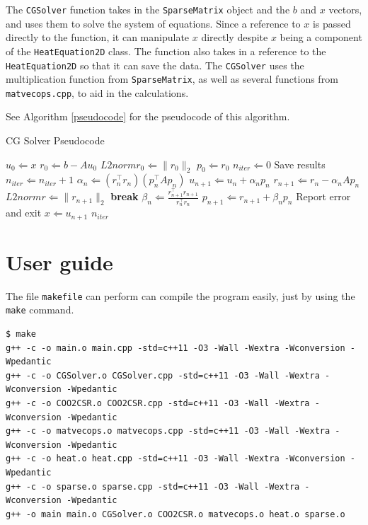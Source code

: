 \documentclass{article}
\begin{document}
The \texttt{CGSolver} function takes in the \texttt{SparseMatrix} object and the $b$ and $x$ vectors, and uses them to solve the system of equations.  Since a reference to $x$ is passed directly to the function, it can manipulate $x$ directly despite $x$ being a component of the \texttt{HeatEquation2D} class.  The function also takes in a reference to the \texttt{HeatEquation2D} so that it can save the data.  The \texttt{CGSolver} uses the multiplication function from \texttt{SparseMatrix}, as well as several functions from \texttt{matvecops.cpp}, to aid in the calculations.

See Algorithm \ref{pseudocode} for the pseudocode of this algorithm.

\begin{algorithm}
  \caption{CG Solver Pseudocode}
  \label{pseudocode}
  \begin{algorithmic}
    \STATE $u_0 \Leftarrow x$
    \STATE $r_0 \Leftarrow b - A u_0$
    \STATE $L2normr_0 \Leftarrow \|r_0\|_2$
    \STATE $p_0 \Leftarrow r_0$
    \STATE $n_{iter} \Leftarrow 0$
        \STATE Save results
      \ENDIF
      \STATE $n_{iter} \Leftarrow n_{iter} + 1$
      \STATE $\alpha_n \Leftarrow \left(r_n^\intercal r_n \right) \left(p_n^\intercal A p_n \right)$
      \STATE $u_{n+1} \Leftarrow u_n + \alpha_n p_n$
      \STATE $r_{n+1} \Leftarrow r_n - \alpha_n A p_n$
      \STATE $L2normr \Leftarrow \|r_{n+1}\|_2$
        \STATE \textbf{break}
      \ENDIF
      \STATE $\beta_n \Leftarrow \frac{r_{n+1}^\intercal r_{n+1}} {r_n^\intercal r_n}$
      \STATE $p_{n+1} \Leftarrow r_{n+1} + \beta_n p_n$
    \ENDWHILE
      \STATE Report error and exit
    \ENDIF
    \STATE $x \Leftarrow u_{n+1}$
    \RETURN $n_{iter}$
  \end{algorithmic}
\end{algorithm}

\section{User guide}

The file \texttt{makefile} can perform can compile the program easily, just by using the \texttt{make} command.

\begin{verbatim}
$ make
g++ -c -o main.o main.cpp -std=c++11 -O3 -Wall -Wextra -Wconversion -Wpedantic
g++ -c -o CGSolver.o CGSolver.cpp -std=c++11 -O3 -Wall -Wextra -Wconversion -Wpedantic
g++ -c -o COO2CSR.o COO2CSR.cpp -std=c++11 -O3 -Wall -Wextra -Wconversion -Wpedantic
g++ -c -o matvecops.o matvecops.cpp -std=c++11 -O3 -Wall -Wextra -Wconversion -Wpedantic
g++ -c -o heat.o heat.cpp -std=c++11 -O3 -Wall -Wextra -Wconversion -Wpedantic
g++ -c -o sparse.o sparse.cpp -std=c++11 -O3 -Wall -Wextra -Wconversion -Wpedantic
g++ -o main main.o CGSolver.o COO2CSR.o matvecops.o heat.o sparse.o
\end{verbatim}
\end{document}

